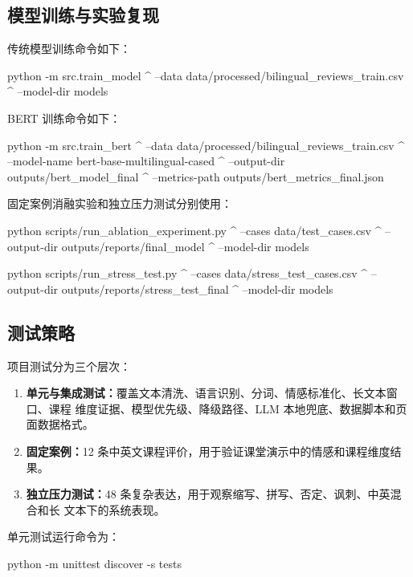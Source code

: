 \subsection{模型训练与实验复现}

传统模型训练命令如下：

\begin{commandblock}
python -m src.train_model ^
  --data data/processed/bilingual_reviews_train.csv ^
  --model-dir models
\end{commandblock}

BERT 训练命令如下：

\begin{commandblock}
python -m src.train_bert ^
  --data data/processed/bilingual_reviews_train.csv ^
  --model-name bert-base-multilingual-cased ^
  --output-dir outputs/bert_model_final ^
  --metrics-path outputs/bert_metrics_final.json
\end{commandblock}

固定案例消融实验和独立压力测试分别使用：

\begin{commandblock}
python scripts/run_ablation_experiment.py ^
  --cases data/test_cases.csv ^
  --output-dir outputs/reports/final_model ^
  --model-dir models

python scripts/run_stress_test.py ^
  --cases data/stress_test_cases.csv ^
  --output-dir outputs/reports/stress_test_final ^
  --model-dir models
\end{commandblock}

\subsection{测试策略}

项目测试分为三个层次：

\begin{enumerate}
  \item \textbf{单元与集成测试：}覆盖文本清洗、语言识别、分词、情感标准化、长文本窗口、课程
        维度证据、模型优先级、降级路径、LLM 本地兜底、数据脚本和页面数据格式。
  \item \textbf{固定案例：}12 条中英文课程评价，用于验证课堂演示中的情感和课程维度结果。
  \item \textbf{独立压力测试：}48 条复杂表达，用于观察缩写、拼写、否定、讽刺、中英混合和长
        文本下的系统表现。
\end{enumerate}

单元测试运行命令为：

\begin{commandblock}
python -m unittest discover -s tests
\end{commandblock}

